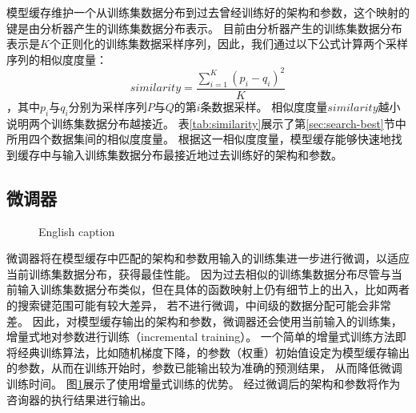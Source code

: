 模型缓存维护一个从训练集数据分布到过去曾经训练好的{\rmi}架构和参数，这个映射的键是由分析器产生的训练集数据分布表示。
目前由分析器产生的训练集数据分布表示是$K$个正则化的训练集数据采样序列，因此，我们通过以下公式计算两个采样序列的相似度度量：
\[
  similarity = \frac{ \sum_{i=1}^{K} (p_i - q_i)^2 }{ K }
\]
，其中$p_i$与$q_i$分别为采样序列$P$与$Q$的第$i$条数据采样。
相似度度量$similarity$越小说明两个训练集数据分布越接近。
表\ref{tab:similarity}展示了第\ref{sec:search-best}节中所用四个数据集间的相似度度量。
根据这一相似度度量，模型缓存能够快速地找到缓存中与输入训练集数据分布最接近地过去训练好的{\rmi}架构和参数。


\subsection{微调器}

\begin{figure}[!htp]
  \centering
    {English caption}
  \label{fig:fine-tuner}
\end{figure}

微调器将在模型缓存中匹配的{\rmi}架构和参数用输入的训练集进一步进行微调，以适应当前训练集数据分布，获得最佳性能。
因为过去相似的训练集数据分布尽管与当前输入训练集数据分布类似，但在具体的函数映射上仍有细节上的出入，比如两者的搜索键范围可能有较大差异，
若不进行微调，{\rmi}中间级{\model}的数据分配可能会非常差。
因此，对模型缓存输出的{\rmi}架构和参数，微调器还会使用当前输入的训练集，增量式地对{\model}参数进行训练（incremental training）。
一个简单的增量式训练方法即将经典训练算法，比如随机梯度下降，的参数（权重）初始值设定为模型缓存输出的参数，从而在训练开始时，参数已能输出较为准确的预测结果，
从而降低微调训练时间。
图\ref{fig:fine-tuner}展示了使用增量式训练的优势。
经过微调后的{\rmi}架构和参数将作为咨询器的执行结果进行输出。

